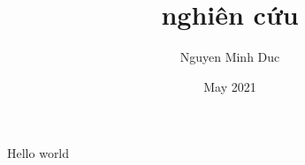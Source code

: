 \documentclass[12pt]{article}
\title{nghiên cứu}
\author{Nguyen Minh Duc}
\date{May 2021}
\begin{document}
\maketitle
 
Hello world
 
\end{document}
